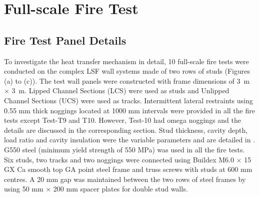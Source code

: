 \section{Full-scale Fire Test}
\subsection{Fire Test Panel Details}\label{sec:fire-test-panel-details}

To investigate the heat transfer mechanism in detail, 10 full-scale fire tests were conducted on the complex LSF wall systems made of two rows of studs (Figures  (a) to (c)). The test wall panels were constructed with frame dimensions of 3~m \(\times\) 3~m. Lipped Channel Sections (LCS) were used as studs and Unlipped Channel Sections (UCS) were used as tracks. Intermittent lateral restraints using 0.55 mm thick noggings located at 1000 mm intervals were provided in all the fire tests except Test-T9 and T10. However, Test-10 had omega noggings and the details are discussed in the corresponding section. Stud thickness, cavity depth, load ratio and cavity insulation were the variable parameters and are detailed in . G550 steel (minimum yield strength of 550 MPa) was used in all the fire tests. Six studs, two tracks and two noggings were connected using Buildex M6.0 \(\times\) 15 GX Ca smooth top GA point steel frame and truss screws with studs at 600 mm centres. A 20 mm gap was maintained between the two rows of steel frames by using 50 mm $\times$ 200 mm spacer plates for double stud walls. 
